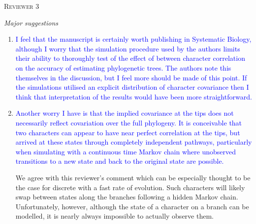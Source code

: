 \documentclass[12pt,letterpaper]{article}
\renewcommand{\section}[1]{%
\bigskip
\begin{center}
\begin{Large}
\normalfont\scshape #1
\medskip
\end{Large}
\end{center}}
\renewcommand{\subsection}[1]{%
\bigskip
\begin{center}
\begin{large}
\normalfont\itshape #1
\end{large}
\end{center}}
\begin{document}
%
%





\section{Reviewer 3}

\subsection{Major suggestions}

\begin{enumerate}

\item{\textcolor{blue}{I feel that the manuscript is certainly worth publishing in Systematic Biology, although I worry that the simulation procedure used by the authors limits their ability to thoroughly test of the effect of between character correlation on the accuracy of estimating phylogenetic trees. The authors note this themselves in the discussion, but I feel more should be made of this point. If the simulations utilised an explicit distribution of character covariance then I think that interpretation of the results would have been more straightforward.}}



\item{\textcolor{blue}{Another worry I have is that the implied covariance at the tips does not necessarily reflect covariation over the full phylogeny. It is conceivable that two characters can appear to have near perfect correlation at the tips, but arrived at these states through completely independent pathways, particularly when simulating with a continuous time Markov chain where unobserved transitions to a new state and back to the original state are possible.}}

We agree with this reviewer's comment which can be especially thought to be the case for discrete with a fast rate of evolution.
Such characters will likely swap between states along the branches following a hidden Markov chain.
Unfortunately, however, although the state of a character on a branch can be modelled, it is nearly always impossible to actually observe them.


\end{enumerate}
\end{document}

